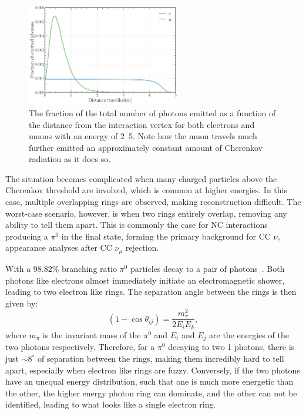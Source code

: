 \begin{figure} %
    \includegraphics[width=0.6\textwidth]{diagrams/4-chips/emission_distance.pdf}
    \caption[Fraction of Cherenkov photons emitted as a function of distance.]
    {The fraction of the total number of photons emitted as a function of the distance from the
        interaction vertex for both electrons and muons with an energy of \unit{2.5}{\GeV}. Note
        how the muon travels much further emitted an approximately constant amount of Cherenkov
        radiation as it does so.}
    \label{fig:emission distance}
\end{figure}

The situation becomes complicated when many charged particles above the Cherenkov threshold are
involved, which is common at higher energies. In this case, multiple overlapping rings are
observed, making reconstruction difficult. The worst-case scenario, however, is when two rings
entirely overlap, removing any ability to tell them apart. This is commonly the case for NC
interactions producing a $\pi^{0}$ in the final state, forming the primary background for CC
$\nu_{e}$ appearance analyses after CC $\nu_{\mu}$ rejection.

With a 98.82\% branching ratio $\pi^{0}$ particles decay to a pair of photons~\cite{particle2020}.
Both photons like electrons almost immediately initiate an electromagnetic shower, leading to two
electron like rings. The separation angle between the rings is then given by:
\begin{equation}
    (1-\cos\theta_{ij})=\frac{m_{\pi}^2}{2E_{i}E_{k}},
\end{equation}
where $m_{\pi}$ is the invariant mass of the $\pi^{0}$ and $E_{i}$ and $E_{j}$ are the energies of
the two photons respectively. Therefore, for a $\pi^{0}$ decaying to two \unit{1}{\GeV} photons,
there is just $\sim 8^{\circ}$ of separation between the rings, making them incredibly hard to
tell apart, especially when electron like rings are fuzzy. Conversely, if the two photons have an
unequal energy distribution, such that one is much more energetic than the other, the higher
energy photon ring can dominate, and the other can not be identified, leading to what looks like a
single electron ring.

